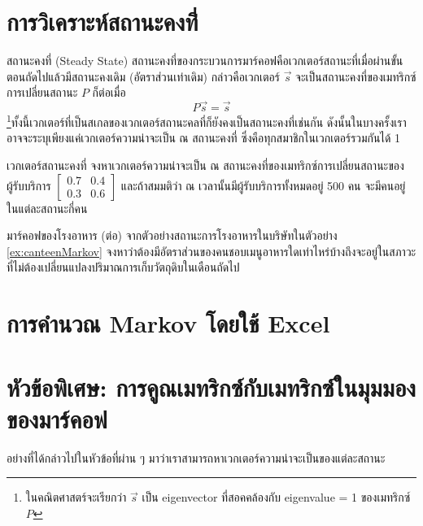 \newpage
\section{การวิเคราะห์สถานะคงที่่}
\begin{definition}
    {สถานะคงที่ (Steady State)}{}
    สถานะคงที่ของกระบวนการมาร์คอฟคือเวกเตอร์สถานะที่เมื่อผ่านขั้นตอนถัดไปแล้วมีสถานะคงเดิม (อัตราส่วนเท่าเดิม) กล่าวคือเวกเตอร์ $\vec{s}$ จะเป็นสถานะคงที่ของเมทริกซ์การเปลี่ยนสถานะ $P$ ก็ต่อเมื่อ
    \[
    P\vec{s} = \vec{s}
    \]
    \footnote{ในคณิตศาสตร์จะเรียกว่า $\vec{s}$ เป็น eigenvector ที่สอคคล้องกับ eigenvalue = 1 ของเมทริกซ์ $P$}ทั้งนี้เวกเตอร์ที่เป็นสเกลของเวกเตอร์สถานะคลที่ก็ยังคงเป็นสถานะคงที่เช่นกัน ดังนั้นในบางครั้งเราอาจจะระบุเพียงแค่เวกเตอร์ความน่าจะเป็น ณ สถานะคงที่ ซึ่งคือทุกสมาชิกในเวกเตอร์รวมกันได้ 1
\end{definition}

\begin{example}
    {เวกเตอร์สถานะคงที่}{}
    จงหาเวกเตอร์ความน่าจะเป็น ณ สถานะคงที่ของเมทริกซ์การเปลี่ยนสถานะของผู้รับบริการ $\begin{bmatrix}0.7 & 0.4 \\ 
                  0.3 & 0.6 \end{bmatrix}$
    และถ้าสมมติว่า ณ เวลานั้นมีผู้รับบริการทั้งหมดอยู่ 500 คน จะมีคนอยู่ในแต่ละสถานะกี่คน
\end{example}
\newpage

\begin{example}
    {มาร์คอฟของโรงอาหาร (ต่อ)}{}
    จากตัวอย่างสถานะการโรงอาหารในบริษัทในตัวอย่าง \ref{ex:canteenMarkov} จงหาว่าต้องมีอัตราส่วนของคนชอบเมนูอาหารใดเท่าไหร่บ้างถึงจะอยู่ในสภาวะที่ไม่ต้องเปลี่ยนแปลงปริมาณการเก็บวัตถุดิบในเดือนถัดไป
\end{example}
\newpage
\section{การคำนวณ Markov โดยใช้ Excel}
\newpage
\section{หัวข้อพิเศษ: การคูณเมทริกซ์กับเมทริกซ์ในมุมมองของมาร์คอฟ}
อย่างที่ได้กล่าวไปในหัวข้อที่ผ่าน ๆ มาว่าเราสามารถหาเวกเตอร์ความน่าจะเป็นของแต่ละสถานะ

